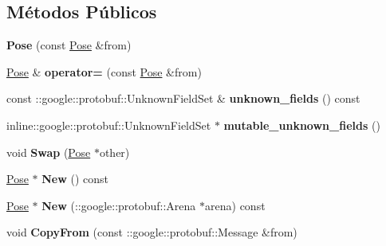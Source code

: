 \subsection*{Métodos Públicos}
\begin{DoxyCompactItemize}
\item 
{\bfseries Pose} (const \hyperlink{classvss__debug_1_1Pose}{Pose} \&from)\hypertarget{classvss__debug_1_1Pose_ad24b46d4d64c036647334e838b1c56e8}{}\label{classvss__debug_1_1Pose_ad24b46d4d64c036647334e838b1c56e8}

\item 
\hyperlink{classvss__debug_1_1Pose}{Pose} \& {\bfseries operator=} (const \hyperlink{classvss__debug_1_1Pose}{Pose} \&from)\hypertarget{classvss__debug_1_1Pose_a34a3f9af832f1fe676b5daf2b9ac7b65}{}\label{classvss__debug_1_1Pose_a34a3f9af832f1fe676b5daf2b9ac7b65}

\item 
const \+::google\+::protobuf\+::\+Unknown\+Field\+Set \& {\bfseries unknown\+\_\+fields} () const \hypertarget{classvss__debug_1_1Pose_a58e4b7aaa136d3f70d2aab34d494d02e}{}\label{classvss__debug_1_1Pose_a58e4b7aaa136d3f70d2aab34d494d02e}

\item 
inline\+::google\+::protobuf\+::\+Unknown\+Field\+Set $\ast$ {\bfseries mutable\+\_\+unknown\+\_\+fields} ()\hypertarget{classvss__debug_1_1Pose_a2bc1876c70aec8f9a7c9cb9fd02d78ef}{}\label{classvss__debug_1_1Pose_a2bc1876c70aec8f9a7c9cb9fd02d78ef}

\item 
void {\bfseries Swap} (\hyperlink{classvss__debug_1_1Pose}{Pose} $\ast$other)\hypertarget{classvss__debug_1_1Pose_a3503ca66641a7d0311a0247a4561e3b1}{}\label{classvss__debug_1_1Pose_a3503ca66641a7d0311a0247a4561e3b1}

\item 
\hyperlink{classvss__debug_1_1Pose}{Pose} $\ast$ {\bfseries New} () const \hypertarget{classvss__debug_1_1Pose_a40be70547898f1a9f273a986b5a6ac05}{}\label{classvss__debug_1_1Pose_a40be70547898f1a9f273a986b5a6ac05}

\item 
\hyperlink{classvss__debug_1_1Pose}{Pose} $\ast$ {\bfseries New} (\+::google\+::protobuf\+::\+Arena $\ast$arena) const \hypertarget{classvss__debug_1_1Pose_a099d0a91b0491b81ac56b097daf6c8d8}{}\label{classvss__debug_1_1Pose_a099d0a91b0491b81ac56b097daf6c8d8}

\item 
void {\bfseries Copy\+From} (const \+::google\+::protobuf\+::\+Message \&from)\hypertarget{classvss__debug_1_1Pose_aa4ad68885b9773c051be4968da48a8ea}{}\label{classvss__debug_1_1Pose_aa4ad68885b9773c051be4968da48a8ea}


\end{DoxyCompactItemize}
